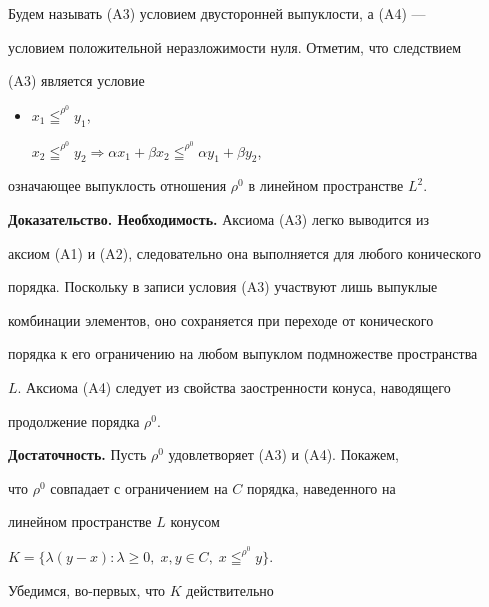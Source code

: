  


\begin{notenonum} 


Будем называть (A3) условием двусторонней выпуклости, а (A4) --- 


условием положительной неразложимости нуля. Отметим, что следствием 


(A3) является условие 


\begin{itemize} 


\item[(A3${}'$)] $x_1\leqq^{\rho^0}y_1$, 


$x_2\leqq^{\rho^0}y_2\Longrightarrow \alpha x_1+\beta x_2 


\leqq^{\rho^0}\alpha y_1+\beta y_2$, 


\end{itemize} 


означающее выпуклость отношения $\rho^0$ в линейном пространстве $L^2$. 


\end{notenonum} 


 


{\bf Доказательство. Необходимость.} Аксиома (A3) легко выводится из 


аксиом (A1) и (A2), следовательно она выполняется для любого конического 


порядка. Поскольку в записи условия (A3) участвуют лишь выпуклые 


комбинации элементов, оно сохраняется при переходе от конического 


порядка к его ограничению на любом выпуклом подмножестве пространства 


$L$. Аксиома (A4) следует из свойства заостренности конуса, наводящего 


продолжение порядка $\rho^0$. 


\medskip 


 


{\bf Достаточность.} Пусть $\rho^0$ удовлетворяет (A3) и (A4). Покажем, 


что $\rho^0$ совпадает с ограничением на $C$ порядка, наведенного на 


линейном пространстве $L$ конусом 


$K=\{\lambda(y-x):\lambda\ge 0,\;x,y\in C,\; x\leqq^{\rho^0}y\}$. 


Убедимся, во-первых, что $K$ действительно 


